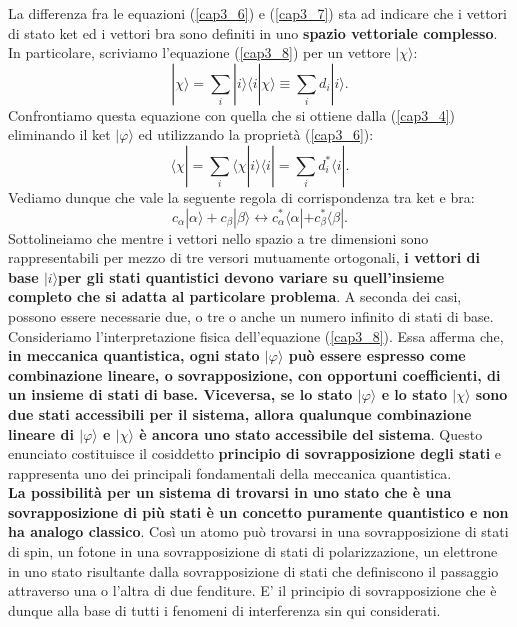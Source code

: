 \documentclass[a4paper,12pt,oneside]{book}
\begin{document}
La differenza fra le equazioni (\ref{cap3_6}) e (\ref{cap3_7}) sta ad indicare che i vettori di stato ket ed i vettori bra sono definiti in uno \textbf{spazio vettoriale complesso}. In particolare, scriviamo l'equazione (\ref{cap3_8}) per un vettore $| \chi\rangle$:
	\begin{equation}
		| \chi \rangle = \sum \limits_{i} | i \rangle \langle i | \chi \rangle \equiv \sum \limits_{i} d_i | i \rangle .
	\end{equation}
Confrontiamo questa equazione con quella che si ottiene dalla (\ref{cap3_4}) eliminando il ket $| \varphi \rangle$ ed utilizzando la proprietà (\ref{cap3_6}):
	\begin{equation}
		\langle \chi | =\sum \limits_{i} \langle \chi | i \rangle \langle i | = \sum \limits_{i} d^*_i \langle i | .
	\end{equation}
Vediamo dunque che vale la seguente regola di corrispondenza tra ket e bra:
	\begin{equation}
		\boxed{
			c_{\alpha}| \alpha \rangle +c_{\beta} | \beta \rangle  \leftrightarrow c^*_{\alpha}\langle \alpha | +c^*_{\beta}\langle \beta | .
			}
	\end{equation}
Sottolineiamo che mentre i vettori nello spazio a tre dimensioni sono rappresentabili per mezzo di tre versori mutuamente ortogonali, \textbf{i vettori di base $| i \rangle $per gli stati quantistici devono variare su quell'insieme completo che si adatta al particolare problema}. A seconda dei casi, possono essere necessarie due, o tre o anche un numero infinito di stati di base.\\

Consideriamo l'interpretazione fisica dell'equazione (\ref{cap3_8}). Essa afferma che, \textbf{in meccanica quantistica, ogni stato $| \varphi \rangle$ può essere espresso come combinazione lineare, o sovrapposizione, con opportuni coefficienti, di un insieme di stati di base. Viceversa, se lo stato $| \varphi \rangle$ e lo stato $| \chi \rangle$ sono due stati accessibili per il sistema, allora qualunque combinazione lineare di $| \varphi \rangle$ e $| \chi \rangle$ è ancora uno stato accessibile del sistema}. Questo enunciato costituisce il cosiddetto \textbf{principio di sovrapposizione degli stati} e rappresenta uno dei principali fondamentali della meccanica quantistica.\\

\textbf{La possibilità per un sistema di trovarsi in uno stato che è una sovrapposizione di più stati è un concetto puramente quantistico e non ha analogo classico}. Così un atomo può trovarsi in una sovrapposizione di stati di spin, un fotone in una sovrapposizione di stati di polarizzazione, un elettrone in uno stato risultante dalla sovrapposizione di stati che definiscono il passaggio attraverso una o l'altra di due fenditure. E' il principio di sovrapposizione che è dunque alla base di tutti i fenomeni di interferenza sin qui considerati.\\
\end{document}
